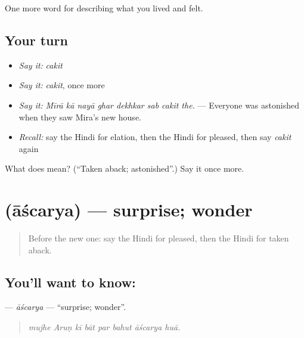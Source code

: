 \begin{grammarlens}[title={What you've built}]
One more word for describing what you lived and felt.
\end{grammarlens}

\subsection*{Your turn}
\begin{itemize}
\raggedright
  \item \emph{Say it:} \emph{cakit}
  \item \emph{Say it:} \emph{cakit}, once more
  \item \emph{Say it:} \emph{Mīrā kā nayā ghar dekhkar sab cakit the.} — Everyone was astonished when they saw Mira's new house.
  \item \emph{Recall:} say the Hindi for elation, then the Hindi for pleased, then say \emph{cakit} again
\end{itemize}

\begin{tcolorbox}[breakable,colback=teal!4,colframe=teal!35!black,title={Before you move on}]
What does  mean? (\textquotedblleft{}Taken aback; astonished\textquotedblright{}.) Say it once more.
\end{tcolorbox}
\section[\texorpdfstring{\hi{आश्चर्य} (āścarya)}{आश्चर्य (āścarya)}]{ (āścarya) — surprise; wonder}

\label{lesson:HI-C454-ascarya}



\begin{quote}
Before the new one: say the Hindi for pleased, then the Hindi for taken aback.
\end{quote}

\subsection*{You'll want to know: }
\textbf{} — \emph{āścarya} — \textquotedblleft{}surprise; wonder\textquotedblright{}.

\begin{quote}
       
\end{quote}

\begin{quote}
\emph{mujhe Aruṇ kī bāt par bahut āścarya huā.}
\end{quote}

